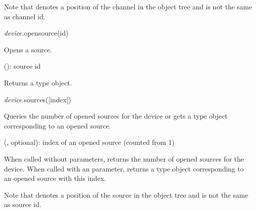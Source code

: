 \documentclass[a4paper,12pt,twoside,extrafontsizes]{memoir}
\begin{document}
\begin{funcremarks}
	Note that  denotes a position of the channel in the object tree and is not the same as channel id.
\end{funcremarks}


\begin{luafuncprototype}
\emph{device}.opensource(id)
\end{luafuncprototype}

\begin{funcdescr}
	Opens a source.
\end{funcdescr}

\begin{funcparams}
	 (): source id
\end{funcparams}

\begin{funcret}
	Returns a  type object.
\end{funcret}


\begin{luafuncprototype}
\emph{device}.sources([index])
\end{luafuncprototype}

\begin{funcdescr}
	Queries the number of opened sources for the device or gets a  type object corresponding to an opened source.
\end{funcdescr}

\begin{funcparams}
	 (, optional): index of an opened source (counted from 1)
\end{funcparams}

\begin{funcret}
	When called without parameters, returns the number of opened sources for the device. When called with an  parameter, returns a  type object corresponding to an opened source with this index.
\end{funcret}

\begin{funcremarks}
	Note that  denotes a position of the source in the object tree and is not the same as source id.
\end{funcremarks}
\end{document}
